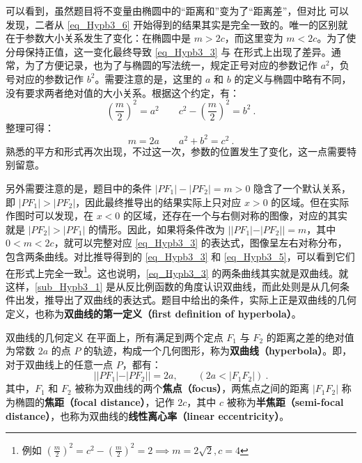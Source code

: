 可以看到，虽然题目将不变量由椭圆中的“距离和”变为了“距离差”，但对比  可以发现，二者从 \autoref{eq_Hypb3_6} 开始得到的结果其实是完全一致的。唯一的区别就在于参数大小关系发生了变化：在椭圆中是 $m > 2c$，而这里变为 $m < 2c$。为了使分母保持正值，这一变化最终导致 \autoref{eq_Hypb3_3} 与  在形式上出现了差异。通常，为了方便记录，也为了与椭圆的写法统一，规定正号对应的参数记作 $a^2$，负号对应的参数记作 $b^2$。需要注意的是，这里的 $a$ 和 $b$ 的定义与椭圆中略有不同，没有要求两者绝对值的大小关系。根据这个约定，有：
\begin{equation}\label{eq_Hypb3_10}
\left(\displaystyle\frac{m}{2}\right)^2=a^2\qquad c^2-\displaystyle\left(\frac{m}{2}\right)^2=b^2~.
\end{equation}
整理可得：
\begin{equation}
m=2a\qquad a^2+b^2=c^2~.
\end{equation}
熟悉的平方和形式再次出现，不过这一次，参数的位置发生了变化，这一点需要特别留意。

另外需要注意的是，题目中的条件 $|PF_1| - |PF_2| = m > 0$ 隐含了一个默认关系，即 $|PF_1| > |PF_2|$，因此最终推导出的结果实际上只对应 $x > 0$ 的区域。但在实际作图时可以发现，在 $x< 0$ 的区域，还存在一个与右侧对称的图像，对应的其实就是 $|PF_2| > |PF_1|$ 的情形。因此，如果将条件改为 $||PF_1| - |PF_2|| = m$，其中 $0 < m < 2c$，就可以完整对应 \autoref{eq_Hypb3_3} 的表达式，图像呈左右对称分布，包含两条曲线。对比推导得到的 \autoref{eq_Hypb3_3} 和 \autoref{eq_Hypb3_5}，可以看到它们在形式上完全一致\footnote{例如 $\left( \frac{m}{2} \right)^2 = c^2 - \left( \frac{m}{2} \right)^2 = 2\implies m = 2\sqrt{2}, c = 4$}。这也说明，\autoref{eq_Hypb3_3} 的两条曲线其实就是双曲线。就这样，\autoref{sub_Hypb3_1} 是从反比例函数的角度认识双曲线，而此处则是从几何条件出发，推导出了双曲线的表达式。题目中给出的条件，实际上正是双曲线的几何定义，也称为\textbf{双曲线的第一定义（first definition of hyperbola）}。
\begin{definition}{双曲线的几何定义}
在平面上，所有满足到两个定点 $F_1$ 与 $F_2$ 的距离之差的绝对值为常数 $2a$ 的点 $P$ 的轨迹，构成一个几何图形，称为\textbf{双曲线（hyperbola）}。即，对于双曲线上的任意一点 $P$，都有：
\begin{equation}
||PF_1| - |PF_2|| = 2a ,\qquad(2a<|F_1F_2|)~.
\end{equation}
其中，$F_1$ 和 $F_2$ 被称为双曲线的两个\textbf{焦点（focus）}，两焦点之间的距离 $|F_1F_2|$ 称为椭圆的\textbf{焦距（focal distance）}，记作 $2c$，其中 $c$ 被称为\textbf{半焦距（semi-focal distance）}，也称为双曲线的\textbf{线性离心率（linear eccentricity）}。
\end{definition}

